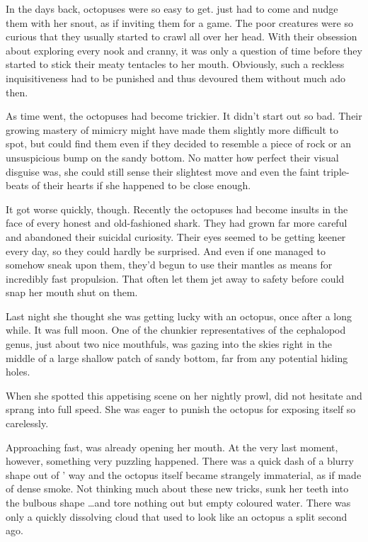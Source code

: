In the days back, octopuses were so easy to get. \sharknameformal just had to come and nudge them with her snout, as if inviting them for a game. The poor creatures were so curious that they usually started to crawl all over her head. With their obsession about exploring every nook and cranny, it was only a question of time before they started to stick their meaty tentacles to her mouth. Obviously, such a reckless inquisitiveness had to be punished and thus \sharknameformal devoured them without much ado then.

As time went, the octopuses had become trickier. It didn't start out so bad. Their growing mastery of mimicry might have made them slightly more difficult to spot, but \sharknameformal could find them even if they decided to resemble a piece of rock or an unsuspicious bump on the sandy bottom. No matter how perfect their visual disguise was, she could still sense their slightest move and even the faint triple-beats of their hearts if she happened to be close enough.

It got worse quickly, though. Recently the octopuses had become insults in the face of every honest and old-fashioned shark. They had grown far more careful and abandoned their suicidal curiosity. Their eyes seemed to be getting keener every day, so they could hardly be surprised. And even if one managed to somehow sneak upon them, they'd begun to use their mantles as means for incredibly fast propulsion. That often let them jet away to safety before \sharknameformal could snap her mouth shut on them.

Last night she thought she was getting lucky with an octopus, once after a long while. It was full moon. One of the chunkier representatives of the cephalopod genus, just about two nice mouthfuls, was gazing into the skies right in the middle of a large shallow patch of sandy bottom, far from any potential hiding holes. 

When she spotted this appetising scene on her nightly prowl, \sharknameformal did not hesitate and sprang into full speed. She was eager to punish the octopus for exposing itself so carelessly. 

Approaching fast, \sharknameformal was already opening her mouth. At the very last moment, however, something very puzzling happened. There was a quick dash of a blurry shape out of \sharknameformal' way and the octopus itself became strangely immaterial, as if made of dense smoke. Not thinking much about these new tricks, \sharknameformal sunk her teeth into the bulbous shape \dots and tore nothing out but empty coloured water. There was only a quickly dissolving cloud that used to look like an octopus a split second ago. 

